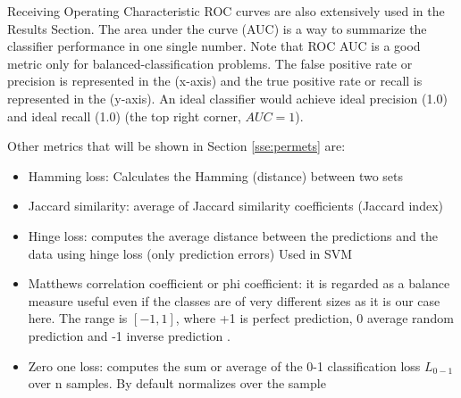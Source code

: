 \documentclass[11pt]{article}
\theoremstyle{definition}
\theoremstyle{remark}
\begin{document}

Receiving Operating Characteristic ROC curves are also extensively used in the Results Section. The area under the curve (AUC) is a way to summarize the classifier performance in one single number. Note that ROC AUC is a good metric only for balanced-classification problems. The false positive rate or precision is represented in the (x-axis) and the true positive rate or recall is represented in the (y-axis). An ideal classifier would achieve ideal precision (1.0) and ideal recall (1.0) (the top right corner, $AUC=1$).

Other metrics that will be shown in Section \ref{sse:permets} are:
\begin{itemize}
	\item Hamming loss: Calculates the Hamming (distance) between two sets
	\item Jaccard similarity: average of Jaccard similarity coefficients (Jaccard index)
	\item Hinge loss: computes the average distance between the predictions and the data using hinge loss (only prediction errors) Used in SVM
	\item Matthews correlation coefficient or phi coefficient: it is regarded as a balance measure useful even if the classes are of very different sizes as it is our case here. The range is $[-1,1]$, where +1 is perfect prediction, 0 average random prediction and -1 inverse prediction \cite{boughorbel2017optimal}. %
	\item Zero one loss: computes the sum or average of the 0-1 classification loss $L_{0-1}$ over n samples. By default normalizes over the sample
\end{itemize}
\end{document}
